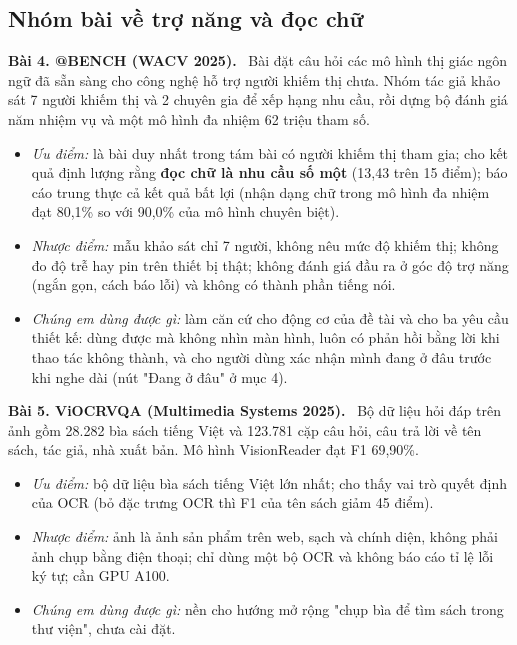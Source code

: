 \documentclass[12pt,a4paper]{article}
\providecommand{\tightlist}{\setlength{\itemsep}{2pt}\setlength{\parskip}{0pt}}
\begin{document}
\subsection{Nhóm bài về trợ năng và đọc chữ}

\textbf{Bài 4. @BENCH (WACV 2025).}~\cite{b4} Bài đặt câu hỏi các mô hình thị giác ngôn ngữ đã sẵn sàng cho công nghệ hỗ trợ người khiếm thị chưa. Nhóm tác giả khảo sát 7 người khiếm thị và 2 chuyên gia để xếp hạng nhu cầu, rồi dựng bộ đánh giá năm nhiệm vụ và một mô hình đa nhiệm 62 triệu tham số.

\begin{itemize}
\tightlist
\item
  \emph{Ưu điểm:} là bài duy nhất trong tám bài có người khiếm thị tham gia; cho kết quả định lượng rằng \textbf{đọc chữ là nhu cầu số một} (13,43 trên 15 điểm); báo cáo trung thực cả kết quả bất lợi (nhận dạng chữ trong mô hình đa nhiệm đạt 80,1\% so với 90,0\% của mô hình chuyên biệt).
\item
  \emph{Nhược điểm:} mẫu khảo sát chỉ 7 người, không nêu mức độ khiếm thị; không đo độ trễ hay pin trên thiết bị thật; không đánh giá đầu ra ở góc độ trợ năng (ngắn gọn, cách báo lỗi) và không có thành phần tiếng nói.
\item
  \emph{Chúng em dùng được gì:} làm căn cứ cho động cơ của đề tài và cho ba yêu cầu thiết kế: dùng được mà không nhìn màn hình, luôn có phản hồi bằng lời khi thao tác không thành, và cho người dùng xác nhận mình đang ở đâu trước khi nghe dài (nút "Đang ở đâu" ở mục 4).
\end{itemize}

\textbf{Bài 5. ViOCRVQA (Multimedia Systems 2025).}~\cite{b5} Bộ dữ liệu hỏi đáp trên ảnh gồm 28.282 bìa sách tiếng Việt và 123.781 cặp câu hỏi, câu trả lời về tên sách, tác giả, nhà xuất bản. Mô hình VisionReader đạt F1 69,90\%.

\begin{itemize}
\tightlist
\item
  \emph{Ưu điểm:} bộ dữ liệu bìa sách tiếng Việt lớn nhất; cho thấy vai trò quyết định của OCR (bỏ đặc trưng OCR thì F1 của tên sách giảm 45 điểm).
\item
  \emph{Nhược điểm:} ảnh là ảnh sản phẩm trên web, sạch và chính diện, không phải ảnh chụp bằng điện thoại; chỉ dùng một bộ OCR và không báo cáo tỉ lệ lỗi ký tự; cần GPU A100.
\item
  \emph{Chúng em dùng được gì:} nền cho hướng mở rộng "chụp bìa để tìm sách trong thư viện", chưa cài đặt.
\end{itemize}
\end{document}
